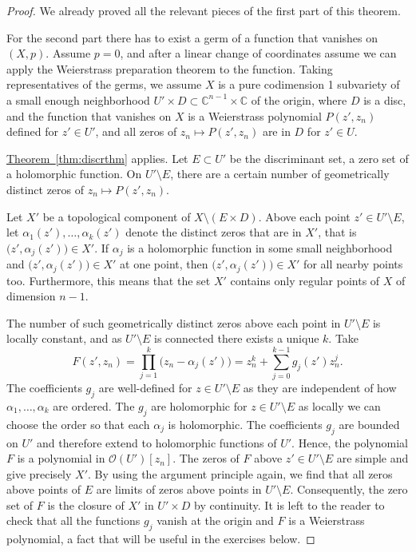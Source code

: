 \documentclass[12pt,openany]{book}
\newcommand{\C}{{\mathbb{C}}}
\newcommand{\sO}{{\mathscr{O}}}
\theoremstyle{plain}
\theoremstyle{remark}
\theoremstyle{definition}
\theoremstyle{exercise}
\theoremstyle{example}
\newcommand{\thmref}[1]{\hyperref[#1]{Theorem~\ref*{#1}}}
\begin{document}
\begin{proof}
We already proved all the relevant pieces of the first part of this
theorem.

For the second part there has to exist a germ of a function that vanishes on
$(X,p)$.  Assume $p=0$, and after a linear change
of coordinates assume we can apply the Weierstrass preparation theorem
to the function.  Taking representatives of the germs, we assume
$X$ is a pure codimension 1 subvariety of a small enough
neighborhood
$U' \times D \subset \C^{n-1} \times \C$ of the origin, where $D$ is a disc,
and the function that vanishes on $X$ is a
Weierstrass polynomial $P(z',z_n)$ defined for $z' \in U'$, and
all zeros of $z_n \mapsto P(z',z_n)$ are in $D$ for $z' \in U$.

\thmref{thm:discrthm} applies. Let
$E \subset U'$ be the discriminant set, a zero set of a
holomorphic function.
On $U' \setminus E$, there are a certain number of geometrically
distinct zeros of $z_n \mapsto P(z',z_n)$.

Let $X'$ be a topological component of $X \setminus ( E \times D )$.
Above each point $z' \in U' \setminus E$, let 
$\alpha_1(z'),\ldots,\alpha_k(z')$ denote the distinct zeros that are in $X'$,
that is $\bigl(z',\alpha_j(z')\bigr) \in X'$.
If $\alpha_j$ is a holomorphic function in some small neighborhood and
$\bigl(z',\alpha_j(z')\bigr) \in X'$ at one point, then 
$\bigl(z',\alpha_j(z')\bigr) \in X'$ for all nearby points too.
Furthermore, this means that the set $X'$ contains only regular points of $X$ of
dimension $n-1$.

The number of
such geometrically distinct zeros above each point in
$U' \setminus E$ is locally constant, and as $U' \setminus E$ is connected
there exists a unique $k$.  Take
\begin{equation*}
F(z',z_n) = \prod_{j=1}^k \bigl( z_n-\alpha_j(z')\bigr)
= 
z_n^k + \sum_{j=0}^{k-1} g_j(z') z_n^j .
\end{equation*}
The coefficients $g_j$ are well-defined for $z \in U' \setminus E$
as they are independent of how $\alpha_1,\ldots,\alpha_k$ are ordered.
The $g_j$ are holomorphic for $z \in U' \setminus E$
as locally we can choose the order so that each $\alpha_j$ is 
holomorphic.
The coefficients $g_j$ are bounded
on $U'$ and therefore extend to holomorphic functions of $U'$.
Hence, the polynomial $F$ is a polynomial
in $\sO(U')[z_n]$.
The zeros of $F$
above $z' \in U' \setminus E$
are simple and give precisely $X'$.
By using the argument principle
again, we find that all zeros above points of $E$ are limits of zeros
above points in $U' \setminus E$.
Consequently,
the zero set of $F$ is the closure of $X'$ in $U' \times D$ by continuity.
It is left to the reader to check that %
all the functions $g_j$ vanish at the origin and $F$ is a Weierstrass
polynomial, a fact that will be useful in the exercises below.


\end{proof}
\end{document}
